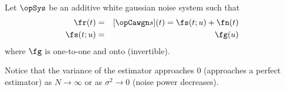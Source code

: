 \begin{theorem}
\label{thm:estML-CR}
Let $\opSys$ be an additive white gaussian noise system 
such that
\begin{eqnarray*} 
   \fr(t)     &=& [\opCawgn s](t) = \fs(t;u) + \fn(t) \\
   \fs(t;u) &=& \fg( u ) 
\end{eqnarray*}
where $\fg$ is one-to-one and onto (invertible).

\end{theorem}

Notice that the variance of the estimator approaches $0$ 
(approaches a perfect estimator) as $N\to\infty$ 
or as $\sigma^2\to 0$ (noise power decreases).


